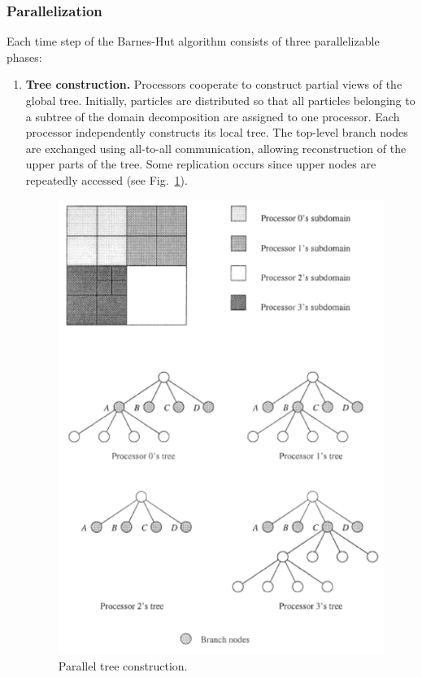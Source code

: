 \documentclass[12pt]{book}
\begin{document}
\subsubsection{Parallelization}
Each time step of the Barnes-Hut algorithm consists of three parallelizable phases:  
\begin{enumerate}
    \item \textbf{Tree construction.} Processors cooperate to construct partial views of the global tree. Initially, particles are distributed so that all particles belonging to a subtree of the domain decomposition are assigned to one processor. Each processor independently constructs its local tree. The top-level branch nodes are exchanged using all-to-all communication, allowing reconstruction of the upper parts of the tree. Some replication occurs since upper nodes are repeatedly accessed (see Fig.~\ref{fig:step1nbody}).
    \begin{figure}[ht]
        \centering
        \includegraphics[width=0.5\linewidth]{images/nbodysimstep1.png}
        \caption{Parallel tree construction.}
        \label{fig:step1nbody}
    \end{figure}


\end{enumerate}
\end{document}
